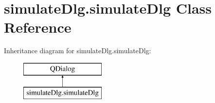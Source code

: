 \hypertarget{classsimulateDlg_1_1simulateDlg}{\section{simulate\-Dlg.\-simulate\-Dlg Class Reference}
\label{classsimulateDlg_1_1simulateDlg}
}
Inheritance diagram for simulate\-Dlg.\-simulate\-Dlg\-:\begin{figure}[H]
\begin{center}
\leavevmode
\includegraphics[height=2.000000cm]{classsimulateDlg_1_1simulateDlg}
\end{center}
\end{figure}
